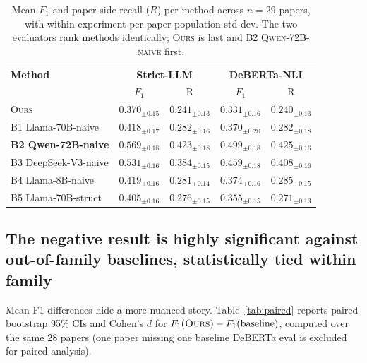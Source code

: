 \documentclass[11pt,a4paper]{article}
\begin{document}
\begin{table}[t]
\centering
\small
\begin{tabular}{l|cc|cc}
\toprule
\textbf{Method} & \multicolumn{2}{c|}{\textbf{Strict-LLM}} & \multicolumn{2}{c}{\textbf{DeBERTa-NLI}}\\
 & $F_1$ & R & $F_1$ & R \\
\midrule
\textsc{Ours} & $0.370_{\pm 0.15}$ & $0.241_{\pm 0.13}$ & $0.331_{\pm 0.16}$ & $0.240_{\pm 0.13}$ \\
B1 Llama-70B-naive & $0.418_{\pm 0.17}$ & $0.282_{\pm 0.16}$ & $0.370_{\pm 0.20}$ & $0.282_{\pm 0.18}$ \\
\textbf{B2 Qwen-72B-naive} & $\mathbf{0.569}_{\pm 0.18}$ & $\mathbf{0.423}_{\pm 0.18}$ & $\mathbf{0.499}_{\pm 0.18}$ & $\mathbf{0.425}_{\pm 0.16}$ \\
B3 DeepSeek-V3-naive & $0.531_{\pm 0.16}$ & $0.384_{\pm 0.15}$ & $0.459_{\pm 0.18}$ & $0.408_{\pm 0.16}$ \\
B4 Llama-8B-naive & $0.419_{\pm 0.16}$ & $0.281_{\pm 0.14}$ & $0.374_{\pm 0.16}$ & $0.285_{\pm 0.15}$ \\
B5 Llama-70B-struct & $0.405_{\pm 0.16}$ & $0.276_{\pm 0.15}$ & $0.355_{\pm 0.15}$ & $0.271_{\pm 0.13}$ \\
\bottomrule
\end{tabular}
\caption{Mean $F_1$ and paper-side recall ($R$) per method across $n\!=\!29$
papers, with within-experiment per-paper population std-dev. The two
evaluators rank methods identically; \textsc{Ours} is last and
\textsc{B2 Qwen-72B-naive} first.}
\label{tab:headline}
\end{table}

\subsection{The negative result is highly significant against out-of-family baselines, statistically tied within family}

Mean F1 differences hide a more nuanced story. Table~\ref{tab:paired}
reports paired-bootstrap 95\% CIs and Cohen's $d$ for $F_1(\textsc{Ours})
- F_1(\text{baseline})$, computed over the same 28 papers (one paper
missing one baseline DeBERTa eval is excluded for paired analysis).
\end{document}
